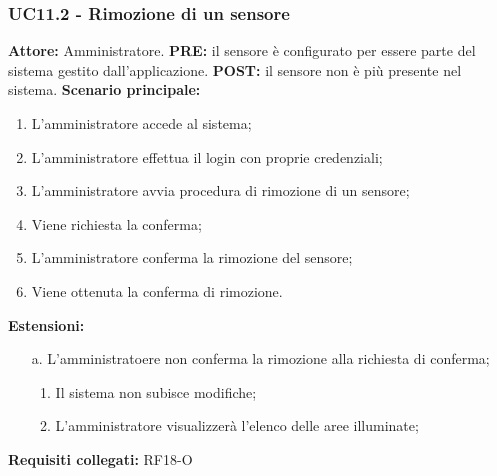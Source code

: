 \documentclass[a4paper, 12pt]{article}
\begin{document}
\subsubsection{UC11.2 - Rimozione di un sensore}
\textbf{Attore:} Amministratore.\newline
\textbf{PRE:} il sensore è configurato per essere parte del sistema gestito dall'applicazione.\newline
\textbf{POST:} il sensore non è più presente nel sistema.\newline
\textbf{Scenario principale:}
\begin{enumerate}
    \item L'amministratore accede al sistema;
    \item L'amministratore effettua il login con proprie credenziali;
    \item L'amministratore avvia procedura di rimozione di un sensore;
    \item Viene richiesta la conferma;
    \item L'amministratore conferma la rimozione del sensore;
    \item Viene ottenuta la conferma di rimozione.
\end{enumerate}
\textbf{Estensioni:}
\begin{itemize}
    \item [a.] L'amministratoere non conferma la rimozione alla richiesta di conferma;
    \begin{enumerate}
        \item Il sistema non subisce modifiche;
        \item L'amministratore visualizzerà l'elenco delle aree illuminate;
    \end{enumerate}
\end{itemize}
\textbf{Requisiti collegati:} RF18-O\newline
\end{document}
